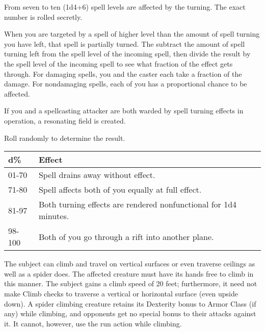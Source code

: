 \begin{multicols}{2}
\begin{small}
\smallskip\noindent From seven to ten (1d4+6) spell levels are affected by the turning. The exact number is rolled secretly.

\smallskip\noindent When you are targeted by a spell of higher level than the amount of spell turning you have left, that spell is partially turned. The subtract the amount of spell turning left from the spell level of the incoming spell, then divide the result by the spell level of the incoming spell to see what fraction of the effect gets through. For damaging spells, you and the caster each take a fraction of the damage. For nondamaging spells, each of you has a proportional chance to be affected.

\smallskip\noindent If you and a spellcasting attacker are both warded by spell turning effects in operation, a resonating field is created.

\smallskip\noindent Roll randomly to determine the result.

\begin{center}
\begin{tabular}[h!]{l|p{2.5in}}
d\% & Effect \\ \hline
01-70 & Spell drains away without effect.	\\
71-80 & Spell affects both of you equally at full effect.	\\
81-97 & Both turning effects are rendered nonfunctional for 1d4 minutes. \\
98-100 & Both of you go through a rift into another plane. \\
\end{tabular}
\end{center}


\noindent The subject can climb and travel on vertical surfaces or even traverse ceilings as well as a spider does. The affected creature must have its hands free to climb in this manner. The subject gains a climb speed of 20 feet; furthermore, it need not make Climb checks to traverse a vertical or horizontal surface (even upside down). A spider climbing creature retains its Dexterity bonus to Armor Class (if any) while climbing, and opponents get no special bonus to their attacks against it. It cannot, however, use the run action while climbing.


\end{small}
\end{multicols}
